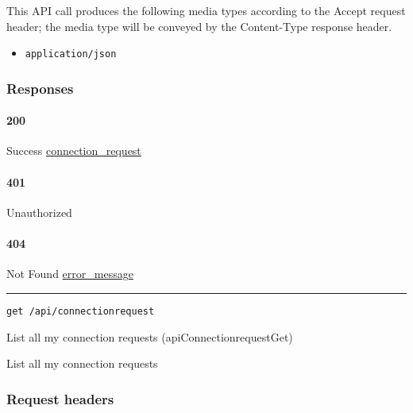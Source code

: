 This API call produces the following media types according to the
{Accept} request header; the media type will be conveyed by the
{Content-Type} response header.

\begin{itemize}
\tightlist
\item
  \texttt{application/json}
\end{itemize}

\hypertarget{responses-53}{%
\subsubsection{Responses}\label{responses-53}}

\hypertarget{section-174}{%
\paragraph{200}\label{section-174}}

Success \protect\hyperlink{connection_request}{connection\_request}

\hypertarget{section-175}{%
\paragraph{401}\label{section-175}}

Unauthorized \protect\hyperlink{}{}

\hypertarget{section-176}{%
\paragraph{404}\label{section-176}}

Not Found \protect\hyperlink{error_message}{error\_message}

\begin{center}\rule{0.5\linewidth}{\linethickness}\end{center}

\protect\hypertarget{apiConnectionrequestGet}{}{}

\begin{verbatim}
get /api/connectionrequest
\end{verbatim}

List all my connection requests ({apiConnectionrequestGet})

List all my connection requests

\hypertarget{request-headers-30}{%
\subsubsection{Request headers}\label{request-headers-30}}

